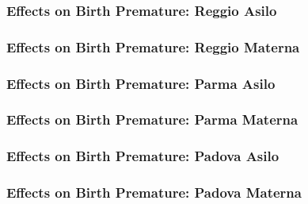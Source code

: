 \documentclass{beamer}
\begin{document}
\begin{frame}
\frametitle{Effects on Birth Premature: Reggio Asilo}
\centering
\footnotesize
\end{frame}

\begin{frame}
\frametitle{Effects on Birth Premature: Reggio Materna}
\centering
\footnotesize
\end{frame}

\begin{frame}
\frametitle{Effects on Birth Premature: Parma Asilo}
\centering
\footnotesize
\end{frame}

\begin{frame}
\frametitle{Effects on Birth Premature: Parma Materna}
\centering
\footnotesize
\end{frame}

\begin{frame}
\frametitle{Effects on Birth Premature: Padova Asilo}
\centering
\footnotesize
\end{frame}

\begin{frame}
\frametitle{Effects on Birth Premature: Padova Materna}
\centering
\footnotesize
\end{frame}
\end{document}
